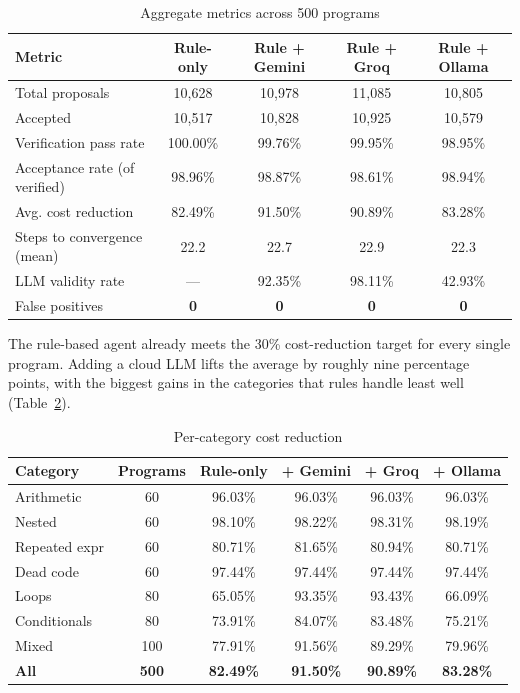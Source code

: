 \documentclass[12pt,a4paper]{report}
\begin{document}
\begin{table}[H]
\centering
\caption{Aggregate metrics across 500 programs}
\label{tab:metrics}
\small
\setlength{\tabcolsep}{4pt}
\begin{tabular}{|l|c|c|c|c|}
\hline
\textbf{Metric} & \textbf{Rule-only} & \textbf{Rule + Gemini} & \textbf{Rule + Groq} & \textbf{Rule + Ollama} \\
\hline
Total proposals & 10,628 & 10,978 & 11,085 & 10,805 \\
\hline
Accepted & 10,517 & 10,828 & 10,925 & 10,579 \\
\hline
Verification pass rate & 100.00\% & 99.76\% & 99.95\% & 98.95\% \\
\hline
Acceptance rate (of verified) & 98.96\% & 98.87\% & 98.61\% & 98.94\% \\
\hline
Avg. cost reduction & 82.49\% & 91.50\% & 90.89\% & 83.28\% \\
\hline
Steps to convergence (mean) & 22.2 & 22.7 & 22.9 & 22.3 \\
\hline
LLM validity rate & --- & 92.35\% & 98.11\% & 42.93\% \\
\hline
False positives & \textbf{0} & \textbf{0} & \textbf{0} & \textbf{0} \\
\hline
\end{tabular}
\end{table}

The rule-based agent already meets the 30\% cost-reduction target for every single program. Adding a cloud LLM lifts the average by roughly nine percentage points, with the biggest gains in the categories that rules handle least well (Table~\ref{tab:categories}).

\begin{table}[H]
\centering
\caption{Per-category cost reduction}
\label{tab:categories}
\small
\begin{tabular}{|l|c|c|c|c|c|}
\hline
\textbf{Category} & \textbf{Programs} & \textbf{Rule-only} & \textbf{+ Gemini} & \textbf{+ Groq} & \textbf{+ Ollama} \\
\hline
Arithmetic & 60 & 96.03\% & 96.03\% & 96.03\% & 96.03\% \\
\hline
Nested & 60 & 98.10\% & 98.22\% & 98.31\% & 98.19\% \\
\hline
Repeated expr & 60 & 80.71\% & 81.65\% & 80.94\% & 80.71\% \\
\hline
Dead code & 60 & 97.44\% & 97.44\% & 97.44\% & 97.44\% \\
\hline
Loops & 80 & 65.05\% & 93.35\% & 93.43\% & 66.09\% \\
\hline
Conditionals & 80 & 73.91\% & 84.07\% & 83.48\% & 75.21\% \\
\hline
Mixed & 100 & 77.91\% & 91.56\% & 89.29\% & 79.96\% \\
\hline
\textbf{All} & \textbf{500} & \textbf{82.49\%} & \textbf{91.50\%} & \textbf{90.89\%} & \textbf{83.28\%} \\
\hline
\end{tabular}
\end{table}
\end{document}
